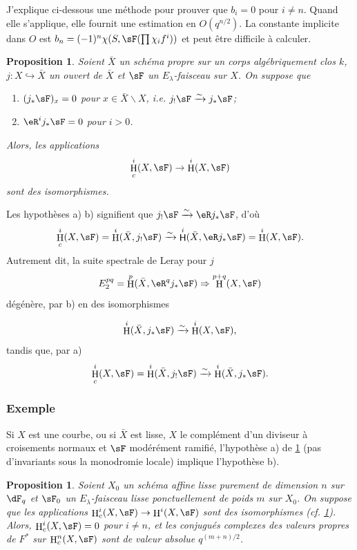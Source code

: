 \documentclass[oneside]{book}
\DeclareMathOperator{\h}{H}
\DeclareMathOperator{\hh}{\mathsf{H}} %
\newcommand{\iso}{\xrightarrow\sim}
\renewcommand{\setminus}{\smallsetminus}
\theoremstyle{sga-source}
\theoremstyle{sga-source-dash}
\theoremstyle{sga-source-dotdash}
\theoremstyle{sga-source-number-note-dash}
\theoremstyle{sga-source-note-number-dotdash}
\theoremstyle{sga-source-example-dotdash}
\theoremstyle{sga-source-inline-number}
\theoremstyle{sga-source-bare-number}
\theoremstyle{sga-source}
\newtheorem{proposition_}[subsection]{Proposition}
\newcommand{\PrintPage}[1]{}\newcommand{\MathPage}[1]{}\newcommand{\PrintCite}[2]{#1}\newcommand{\var}[3]{#2}
\begin{document}
J'explique ci-dessous une méthode pour prouver que $b_i=0$ pour $i\ne n$. 
Quand elle s'applique, elle fournit une estimation en $O(q^{n/2})$. La constante 
implicite dans $O$ est $b_n=(-1)^n \chi(S,\sF(\prod \chi_i f^i))$ et peut 
être difficile à calculer. 





\begin{proposition_}\label{VI:1-19}
Soient $\bar X$ un schéma propre sur un corps alg\'ebriquement clos $k$, 
$j:X\hookrightarrow \bar X$ \var{un ouvert de $X$}{un ouvert de $\bar X$}{S45-SOL-0719} et $\sF$ un $E_\lambda$-faisceau 
sur $X$. On suppose que 
\begin{enumerate}[\indent a)]
  \item $(j_\ast\sF)_x = 0$ pour $x\in \bar X\setminus X$, i.e. 
    $j_!\sF\iso j_\ast\sF$; 
  \item $\eR^i j_\ast \sF = 0$ pour $i>0$.
\end{enumerate}
Alors, les applications 
\[
  \h_c^i(X,\sF) \to \h^i(X,\sF)
\]
sont des isomorphismes. 
\end{proposition_}

Les hypothèses a) b) signifient que $j_! \sF \iso \eR j_\ast \sF$, d'où 
\[
  \h_c^i(X,\sF) = \h^i(\bar X,j_!\sF) \iso \hh^i(\bar X,\eR j_\ast \sF) = \h^i(X,\sF) \text{.}
\]
Autrement dit, la suite spectrale de Leray pour $j$ 
\[
  E_2^{pq} = \h^p(\bar X,\eR^q j_\ast \sF) \Rightarrow \h^{p+q}(X,\sF) 
\]
dégénère, par b) en des isomorphismes 
\PrintPage{180}
\[
  \h^i(\bar X,j_\ast\sF) \iso \h^i(X,\sF) \text{,}
\]
tandis que, par a) 
\[
  \h_c^i(X,\sF) = \h^i(\bar X,j_!\sF) \iso \h^i(\bar X,j_\ast\sF) \text{.}
\]





\subsubsection{Exemple}\label{VI:1-19-1}

Si $X$ est une courbe, ou si $\bar X$ est lisse, $X$ le complément d'un 
diviseur à croisements normaux et $\sF$ modérément ramifié, 
l'hypothèse a) de \ref{VI:1-19} (pas d'invariants sous la monodromie locale) 
implique l'hypothèse b). 





\begin{proposition_}\label{VI:1-20}
Soient $X_0$ un schéma affine lisse purement de dimension $n$ sur $\dF_q$ et 
$\sF_0$ un $E_\lambda$-faisceau lisse ponctuellement de poids $m$ sur $X_0$. On 
suppose que les applications $\h_c^i(X,\sF) \to \h^i(X,\sF)$ sont des 
isomorphismes \var{(cf. \ref{VI:1-17})}{(cf. \ref{VI:1-19})}{S45-SOL-0721}. Alors, $\h_c^i(X,\sF) = 0$ pour $i\ne n$, et 
les conjugués complexes des valeurs propres de $F^\ast$ sur $\h_c^n(X,\sF)$ 
sont de valeur absolue $q^{(m+n)/2}$. 
\end{proposition_}
\end{document}
